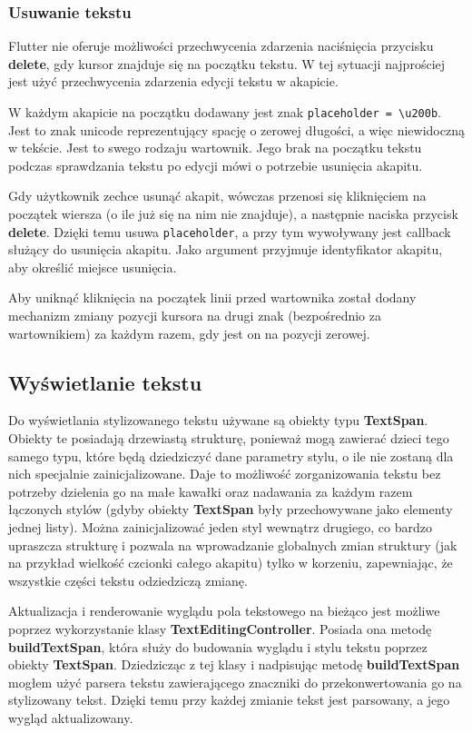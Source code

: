 \subsubsection{Usuwanie tekstu}
\label{eq:usuwanieTekstu}

Flutter nie oferuje możliwości przechwycenia zdarzenia naciśnięcia przycisku \textbf{delete}, gdy kursor znajduje się na początku tekstu. W tej sytuacji najprościej jest użyć przechwycenia zdarzenia edycji tekstu w akapicie.

W każdym akapicie na początku dodawany jest znak \verb|placeholder = \u200b|. Jest to znak unicode reprezentujący spację o zerowej długości, a więc niewidoczną w tekście. Jest to swego rodzaju wartownik. Jego brak na początku tekstu podczas sprawdzania tekstu po edycji mówi o potrzebie usunięcia akapitu.

Gdy użytkownik zechce usunąć akapit, wówczas przenosi się kliknięciem na początek wiersza (o ile już się na nim nie znajduje), a następnie naciska przycisk \textbf{delete}. Dzięki temu usuwa \verb|placeholder|, a przy tym wywoływany jest callback służący do usunięcia akapitu. Jako argument przyjmuje identyfikator akapitu, aby określić miejsce usunięcia.

Aby uniknąć kliknięcia na początek linii przed wartownika został dodany mechanizm zmiany pozycji kursora na drugi znak (bezpośrednio za wartownikiem) za każdym razem, gdy jest on na pozycji zerowej.

\subsection{Wyświetlanie tekstu}

Do wyświetlania stylizowanego tekstu używane są obiekty typu \textbf{TextSpan}. Obiekty te posiadają drzewiastą strukturę, ponieważ mogą zawierać dzieci tego samego typu, które będą dziedziczyć dane parametry stylu, o ile nie zostaną dla nich specjalnie zainicjalizowane. Daje to możliwość zorganizowania tekstu bez potrzeby dzielenia go na małe kawałki oraz nadawania za każdym razem łączonych stylów (gdyby obiekty \textbf{TextSpan} były przechowywane jako elementy jednej listy). Można zainicjalizować jeden styl wewnątrz drugiego, co bardzo upraszcza strukturę i pozwala na wprowadzanie globalnych zmian struktury (jak na przykład wielkość czcionki całego akapitu) tylko w korzeniu, zapewniając, że wszystkie części tekstu odziedziczą zmianę.

Aktualizacja i renderowanie wyglądu pola tekstowego na bieżąco jest możliwe poprzez wykorzystanie klasy \textbf{TextEditingController}. Posiada ona metodę \textbf{buildTextSpan}, która służy do budowania wyglądu i stylu tekstu poprzez obiekty \textbf{TextSpan}. Dziedzicząc z tej klasy i nadpisując metodę \textbf{buildTextSpan} mogłem użyć parsera tekstu zawierającego znaczniki do przekonwertowania go na stylizowany tekst.
Dzięki temu przy każdej zmianie tekst jest parsowany, a jego wygląd aktualizowany.

